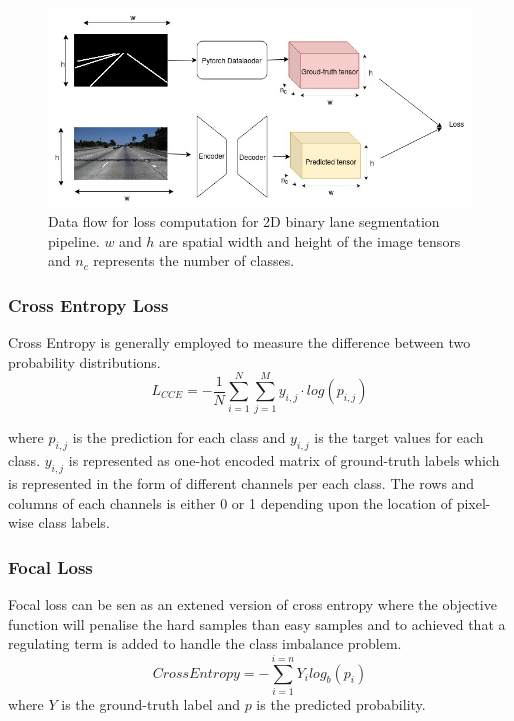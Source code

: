                  \begin{figure}[h]
    \centering
    \includegraphics[width=13cm]{images/2d_dataflow_loss_computation.jpg}
    \caption{Data flow for loss computation for 2D binary lane segmentation pipeline. $w$ and $h$ are spatial width and height of the image tensors and $n_{c}$ represents the number of classes.}
    \end{figure}
        
        \subsubsection{Cross Entropy Loss}
        Cross Entropy is generally employed to measure the difference between two probability distributions.
        \begin{equation}
        L_{CCE} = -\frac{1}{N}\sum_{i=1}^{N} \sum^{M}_{j=1}y_{i,j}\cdot log(p_{i,j})
        \end{equation}
        
        where $p_{i,j}$ is the prediction for each class and $y_{i,j}$ is the target values for each class. $y_{i,j}$ is represented as one-hot encoded matrix of ground-truth labels which is represented in the form of different channels per each class. The rows and columns of each channels is either 0 or 1 depending upon the location of pixel-wise class labels. 
       
        \subsubsection{Focal Loss}
        Focal loss can be sen as an extened version of cross entropy where the objective function will penalise the hard samples than easy samples and to achieved that a regulating term is added to handle the class imbalance problem.
        \begin{equation}
            Cross Entropy = - \sum^{i=n}_{i=1}Y_{i}log_{b}(p_{i})
        \end{equation}
        where $Y$ is the ground-truth label and $p$ is the predicted probability.
        
